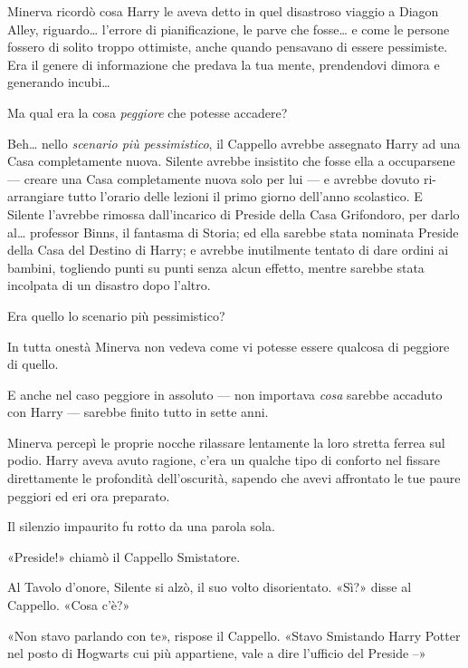 Minerva ricordò cosa Harry le aveva detto in quel disastroso viaggio a Diagon Alley, riguardo… l’errore di pianificazione, le parve che fosse… e come le persone fossero di solito troppo ottimiste, anche quando pensavano di essere pessimiste. Era il genere di informazione che predava la tua mente, prendendovi dimora e generando incubi…

Ma qual era la cosa \textit{peggiore} che potesse accadere?

Beh… nello \textit{scenario più pessimistico}, il Cappello avrebbe assegnato Harry ad una Casa completamente nuova. Silente avrebbe insistito che fosse ella a occuparsene — creare una Casa completamente nuova solo per lui — e avrebbe dovuto ri-arrangiare tutto l’orario delle lezioni il primo giorno dell’anno scolastico. E Silente l’avrebbe rimossa dall’incarico di Preside della Casa Grifondoro, per darlo al… professor Binns, il fantasma di Storia; ed ella sarebbe stata nominata Preside della Casa del Destino di Harry; e avrebbe inutilmente tentato di dare ordini ai bambini, togliendo punti su punti senza alcun effetto, mentre sarebbe stata incolpata di un disastro dopo l’altro.

Era quello lo scenario più pessimistico?

In tutta onestà Minerva non vedeva come vi potesse essere qualcosa di peggiore di quello.

E anche nel caso peggiore in assoluto — non importava \textit{cosa} sarebbe accaduto con Harry — sarebbe finito tutto in sette anni.

Minerva percepì le proprie nocche rilassare lentamente la loro stretta ferrea sul podio. Harry aveva avuto ragione, c’era un qualche tipo di conforto nel fissare direttamente le profondità dell’oscurità, sapendo che avevi affrontato le tue paure peggiori ed eri ora preparato.

Il silenzio impaurito fu rotto da una parola sola.

«Preside!» chiamò il Cappello Smistatore.

Al Tavolo d’onore, Silente si alzò, il suo volto disorientato. «Sì?» disse al Cappello. «Cosa c’è?»

«Non stavo parlando con te», rispose il Cappello. «Stavo Smistando Harry Potter nel posto di Hogwarts cui più appartiene, vale a dire l’ufficio del Preside –»



